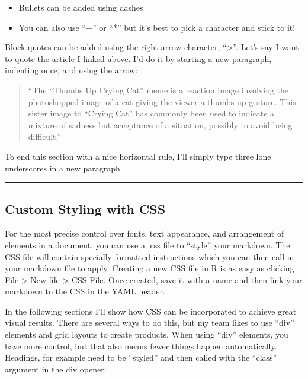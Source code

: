 \documentclass[
]{article}
\providecommand{\tightlist}{%
  \setlength{\itemsep}{0pt}\setlength{\parskip}{0pt}}
\begin{document}
\begin{itemize}
\tightlist
\item
  Bullets can be added using dashes
\item
  You can also use ``+'' or ``*'' but it's best to pick a character and
  stick to it!
\end{itemize}

Block quotes can be added using the right arrow character,
``\textgreater{}''. Let's say I want to quote the article I linked
above. I'd do it by starting a new paragraph, indenting once, and using
the arrow:

\begin{quote}
``The ``Thumbs Up Crying Cat'' meme is a reaction image involving the
photoshopped image of a cat giving the viewer a thumbs-up gesture. This
sister image to ``Crying Cat'' has commonly been used to indicate a
mixture of sadness but acceptance of a situation, possibly to avoid
being difficult.''
\end{quote}

To end this section with a nice horizontal rule, I'll simply type three
lone underscores in a new paragraph.

\begin{center}\rule{0.5\linewidth}{0.5pt}\end{center}

\subsection{Custom Styling with CSS}\label{custom-styling-with-css}

For the most precise control over fonts, text appearance, and
arrangement of elements in a document, you can use a .css file to
``style'' your markdown. The CSS file will contain specially formatted
instructions which you can then call in your markdown file to apply.
Creating a new CSS file in R is as easy as clicking File \textgreater{}
New file \textgreater{} CSS File. Once created, save it with a name and
then link your markdown to the CSS in the YAML header.

In the following sections I'll show how CSS can be incorporated to
achieve great visual results. There are several ways to do this, but my
team likes to use ``div'' elements and grid layouts to create products.
When using ``div'' elements, you have more control, but that also means
fewer things happen automatically. Headings, for example need to be
``styled'' and then called with the ``class'' argument in the div
opener:
\end{document}
